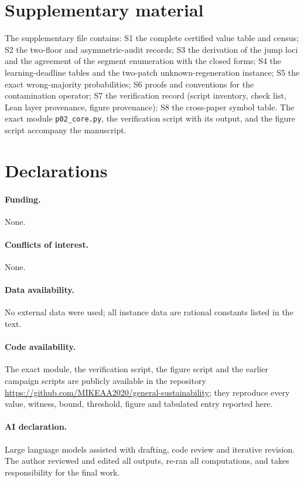 \section*{Supplementary material}
The supplementary file  contains: S1 the complete certified value table and census; S2 the two-floor and asymmetric-audit records; S3 the derivation of the jump loci and the agreement of the segment enumeration with the closed forms; S4 the learning-deadline tables and the two-patch unknown-regeneration instance; S5 the exact wrong-majority probabilities; S6 proofs and conventions for the contamination operator; S7 the verification record (script inventory, check list, Lean layer provenance, figure provenance); S8 the cross-paper symbol table. The exact module \texttt{p02\_core.py}, the verification script  with its output, and the figure script accompany the manuscript.

\section*{Declarations}
\paragraph{Funding.} None.
\paragraph{Conflicts of interest.} None.
\paragraph{Data availability.} No external data were used; all instance data are rational constants listed in the text.
\paragraph{Code availability.} The exact module, the verification script, the figure script and the earlier campaign scripts are publicly available in the repository \url{https://github.com/MIKEAA2020/general-sustainability}; they reproduce every value, witness, bound, threshold, figure and tabulated entry reported here.
\paragraph{AI declaration.} Large language models assisted with drafting, code review and iterative revision. The author reviewed and edited all outputs, re-ran all computations, and takes responsibility for the final work.


